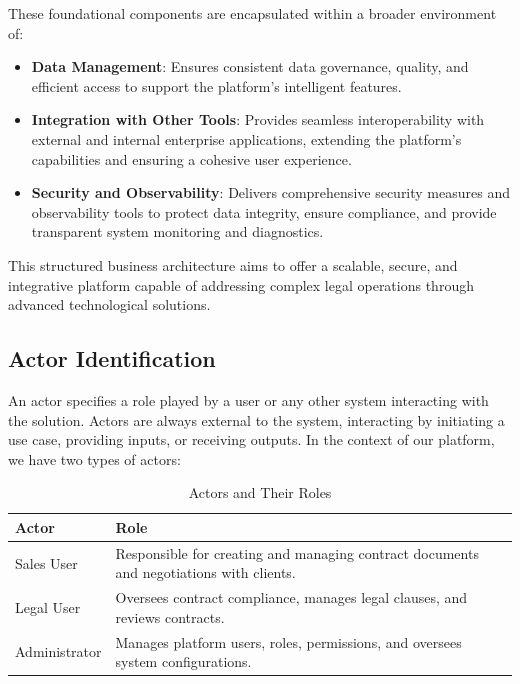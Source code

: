 These foundational components are encapsulated within a broader environment of:

\begin{itemize}
\item \textbf{Data Management}: Ensures consistent data governance, quality, and efficient access to support the platform's intelligent features.
\item \textbf{Integration with Other Tools}: Provides seamless interoperability with external and internal enterprise applications, extending the platform's capabilities and ensuring a cohesive user experience.
\item \textbf{Security and Observability}: Delivers comprehensive security measures and observability tools to protect data integrity, ensure compliance, and provide transparent system monitoring and diagnostics.
\end{itemize}

This structured business architecture aims to offer a scalable, secure, and integrative platform capable of addressing complex legal operations through advanced technological solutions.

\subsection{Actor Identification}
An actor specifies a role played by a user or any other system interacting with the solution. Actors are always external to the system, interacting by initiating a use case, providing inputs, or receiving outputs. In the context of our platform, we have two types of actors:

\begin{table}[ht!]
    \centering
    \small
    \begin{tabularx}{\textwidth}{|l|X|}
        \hline
        \textbf{Actor} & \textbf{Role} \\
        \hline
        Sales User & Responsible for creating and managing contract documents and negotiations with clients. \\
        Legal User & Oversees contract compliance, manages legal clauses, and reviews contracts. \\
        Administrator & Manages platform users, roles, permissions, and oversees system configurations. \\
        \hline
    \end{tabularx}
    \caption{Actors and Their Roles}
    \label{tab:actorsWithRoles}
\end{table}

